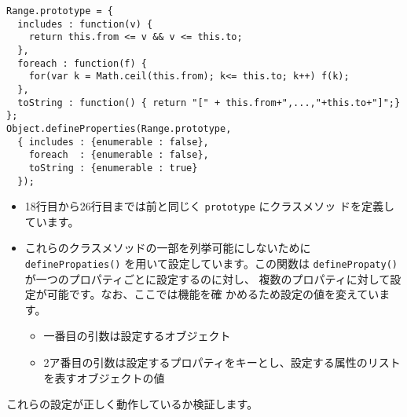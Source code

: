 \begin{Verbatim}[firstnumber=last]
Range.prototype = {
  includes : function(v) {
    return this.from <= v && v <= this.to;
  },
  foreach : function(f) {
    for(var k = Math.ceil(this.from); k<= this.to; k++) f(k);
  },
  toString : function() { return "[" + this.from+",...,"+this.to+"]";}
};
Object.defineProperties(Range.prototype, 
  { includes : {enumerable : false},
    foreach  : {enumerable : false},
    toString : {enumerable : true}
  });
\end{Verbatim}
\begin{itemize}
 \item 18行目から26行目までは前と同じく \texttt{prototype} にクラスメソッ
       ドを定義しています。
 \item これらのクラスメソッドの一部を列挙可能にしないために
       \texttt{definePropaties()} を用いて設定しています。この関数は
       \texttt{definePropaty()} が一つのプロパティごとに設定するのに対し、
       複数のプロパティに対して設定が可能です。なお、ここでは機能を確
       かめるため設定の値を変えています。
\begin{itemize}
 \item 一番目の引数は設定するオブジェクト
 \item 2ア番目の引数は設定するプロパティをキーとし、設定する属性のリスト
       を表すオブジェクトの値
\end{itemize}
\end{itemize}
これらの設定が正しく動作しているか検証します。
